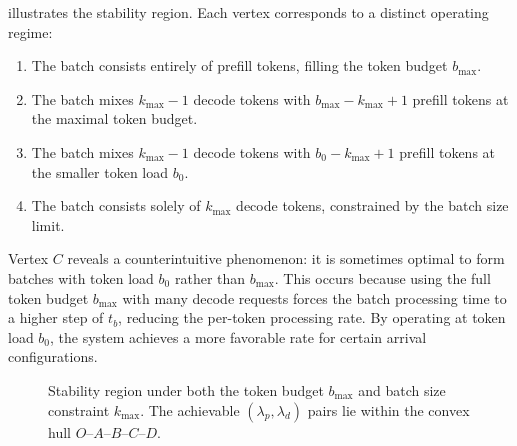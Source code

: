 \documentclass[11pt]{article}
\theoremstyle{plain}
\theoremstyle{definition}
\theoremstyle{remark}
\begin{document}
 illustrates the stability region. Each vertex corresponds to a distinct operating regime:
\begin{enumerate}
    \item[\textbf{(A)}] The batch consists entirely of prefill tokens, filling the token budget $b_{\max}$.
    \item[\textbf{(B)}] The batch mixes $k_{\max}-1$ decode tokens with $b_{\max}-k_{\max}+1$ prefill tokens at the maximal token budget.
    \item[\textbf{(C)}] The batch mixes $k_{\max}-1$ decode tokens with $b_0 - k_{\max} + 1$ prefill tokens at the smaller token load $b_0$.
    \item[\textbf{(D)}] The batch consists solely of $k_{\max}$ decode tokens, constrained by the batch size limit.
\end{enumerate}

Vertex $C$ reveals a counterintuitive phenomenon: it is sometimes optimal to form batches with token load $b_0$ rather than $b_{\max}$. This occurs because using the full token budget $b_{\max}$ with many decode requests forces the batch processing time to a higher step of $t_b$, reducing the per-token processing rate. By operating at token load $b_0$, the system achieves a more favorable rate for certain arrival configurations.

\begin{figure}[t]
\centering
{}
\caption{Stability region under both the token budget $b_{\max}$ and batch size constraint $k_{\max}$. The achievable $(\lambda_p, \lambda_d)$ pairs lie within the convex hull $O$--$A$--$B$--$C$--$D$.}
\label{fig:convexhull}
\end{figure}
\end{document}
